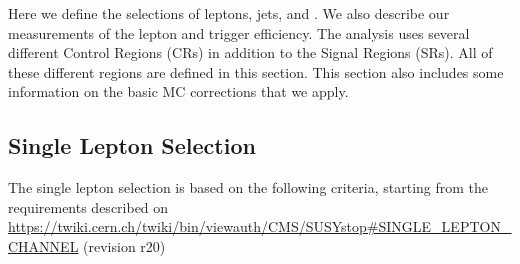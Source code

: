 Here we define the selections of leptons, jets, and \met.
We also describe our measurements of the lepton and trigger efficiency.
The analysis uses several different Control Regions (CRs) in addition
to the Signal 
Regions (SRs).
All of these different regions are defined in this section.
This section also includes some information on the basic MC
corrections that we apply.  

\subsection{Single Lepton Selection}
\label{sec:singlelepselection}

The single lepton selection is based on the following criteria, starting from the requirements described 
on \url{https://twiki.cern.ch/twiki/bin/viewauth/CMS/SUSYstop#SINGLE_LEPTON_CHANNEL} (revision r20)
